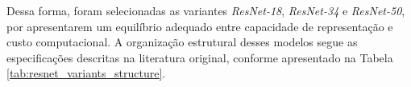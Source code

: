 Dessa forma, foram selecionadas as variantes \textit{ResNet-18}, \textit{ResNet-34} e \textit{ResNet-50}, por apresentarem um equilíbrio adequado entre capacidade de representação e custo computacional. A organização estrutural desses modelos segue as especificações descritas na literatura original, conforme apresentado na Tabela \ref{tab:resnet_variants_structure}.

\begin{table}[h]
	\centering
	\caption{Comparação estrutural dos diferentes modelos variantes da arquitetura \textit{ResNet}.}
	\label{tab:resnet_variants_structure}
	\renewcommand{\arraystretch}{1.1}
	
\end{table}
